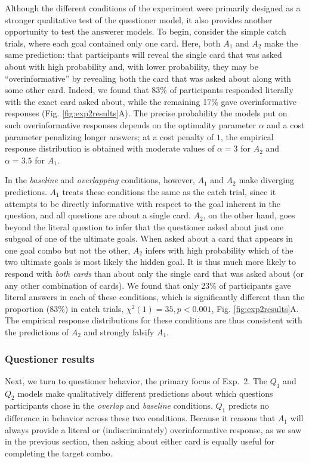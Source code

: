 \documentclass[11pt, floatsintext]{apa6}
\begin{document}
Although the different conditions of the experiment were primarily designed as a stronger qualitative test of the questioner model, it also provides another opportunity to test the answerer models. 
To begin, consider the simple catch trials, where each goal contained only one card.
Here, both $A_1$ and $A_2$ make the same prediction: that participants will reveal the single card that was asked about with high probability and, with lower probability, they may be ``overinformative'' by revealing both the card that was asked about along with some other card.
Indeed, we found that 83\% of participants responded literally with the exact card asked about, while the remaining 17\% gave overinformative responses (Fig. \ref{fig:exp2results}A).
The precise probability the models put on such overinformative responses depends on the optimality parameter $\alpha$ and a cost parameter penalizing longer answers; at a cost penalty of $1$, the empirical response distribution is obtained with moderate values of $\alpha=3$ for $A_2$ and $\alpha = 3.5$ for $A_1$.

In the \emph{baseline} and \emph{overlapping} conditions, however, $A_1$ and $A_2$ make diverging predictions. 
$A_1$ treats these conditions the same as the catch trial, since it attempts to be directly informative with respect to the goal inherent in the question, and all questions are about a single card.
$A_2$, on the other hand, goes beyond the literal question to infer that the questioner asked about just one subgoal of one of the ultimate goals.
When asked about a card that appears in one goal combo but not the other, $A_2$ infers with high probability which of the two ultimate goals is most likely the hidden goal. 
It is thus much more likely to respond with \emph{both cards} than about only the single card that was asked about (or any other combination of cards). 
We found that only 23\% of participants gave literal answers in each of these conditions, which is significantly different than the proportion (83\%) in catch trials, $\chi^2(1) = 35, p < 0.001$, Fig. \ref{fig:exp2results}A.
The empirical response distributions for these conditions are thus consistent with the predictions of $A_2$ and strongly falsify $A_1$.

\subsubsection{Questioner results}

Next, we turn to questioner behavior, the primary focus of Exp.~2.
The $Q_1$ and $Q_2$ models make qualitatively different predictions about which questions participants chose in the \emph{overlap} and \emph{baseline} conditions.
$Q_1$ predicts no difference in behavior across these two conditions.
Because it reasons that $A_1$ will always provide a literal or (indiscriminately) overinformative response, as we saw in the previous section, then asking about either card is equally useful for completing the target combo.
\end{document}
